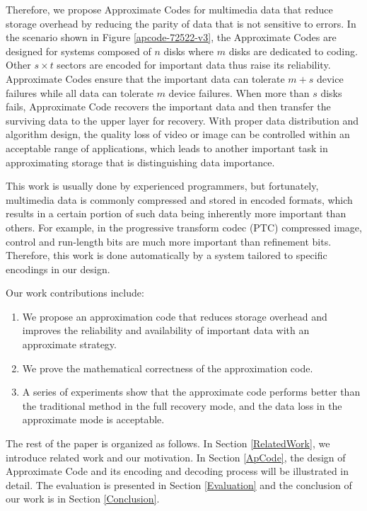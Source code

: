 \documentclass[sigconf]{acmart}
\begin{document}
Therefore, we propose Approximate Codes for multimedia data that reduce storage overhead by reducing the parity of data that is not sensitive to errors. In the scenario shown in Figure \ref{apcode-72522-v3}, the Approximate Codes are designed for systems composed of $n$ disks where $m$ disks are dedicated to coding.
Other $s \times t$ sectors are encoded for important data thus raise its reliability. Approximate Codes ensure that the important data can tolerate $m+s$ device failures while all data can tolerate $m$ device failures.
When more than $s$ disks fails, Approximate Code recovers the important data and then transfer the surviving data to the upper layer for recovery. With proper data distribution and algorithm design, the quality loss of video or image can be controlled within an acceptable range of applications, which leads to another important task in approximating storage that is distinguishing data importance.

This work is usually done by experienced programmers, but fortunately, multimedia data is commonly compressed and stored in encoded formats, which results in a certain portion of such data being inherently more important than others. For example, in the progressive transform codec (PTC) compressed image, control and run-length bits are much more important than refinement bits. Therefore, this work is done automatically by a system tailored to specific encodings in our design.

Our work contributions include:
\begin{enumerate}
\item We propose an approximation code that reduces storage overhead and improves the reliability and availability of important data with an approximate strategy.
\item We prove the mathematical correctness of the approximation code.
\item A series of experiments show that the approximate code performs better than the traditional method in the full recovery mode, and the data loss in the approximate mode is acceptable.
\end{enumerate}

The rest of the paper is organized as follows. In Section \ref{RelatedWork}, we introduce related work and our motivation. In Section \ref{ApCode}, the design of Approximate Code and its encoding and decoding process will be illustrated in detail. The evaluation is presented in Section \ref{Evaluation} and the conclusion of our work is in Section \ref{Conclusion}. 
\end{document}
